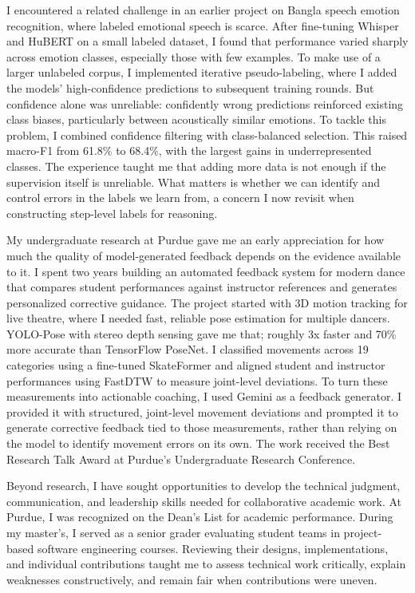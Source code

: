 \documentclass{article}
\begin{document}

I encountered a related challenge in an earlier project on Bangla speech emotion recognition, where labeled emotional speech is scarce. After fine-tuning Whisper and HuBERT on a small labeled dataset, I found that performance varied sharply across emotion classes, especially those with few examples. To make use of a larger unlabeled corpus, I implemented iterative pseudo-labeling, where I added the models’ high-confidence predictions to subsequent training rounds. But confidence alone was unreliable: confidently wrong predictions reinforced existing class biases, particularly between acoustically similar emotions. To tackle this problem, I combined confidence filtering with class-balanced selection. This raised macro-F1 from 61.8\% to 68.4\%, with the largest gains in underrepresented classes. The experience taught me that adding more data is not enough if the supervision itself is unreliable. What matters is whether we can identify and control errors in the labels we learn from, a concern I now revisit when constructing step-level labels for reasoning.


My undergraduate research at Purdue gave me an early appreciation for how much the quality of model-generated feedback depends on the evidence available to it. I spent two years building an automated feedback system for modern dance that compares student performances against instructor references and generates personalized corrective guidance. The project started with 3D motion tracking for live theatre, where I needed fast, reliable pose estimation for multiple dancers. YOLO-Pose with stereo depth sensing gave me that; roughly 3x faster and 70\% more accurate than TensorFlow PoseNet. I classified movements across 19 categories using a fine-tuned SkateFormer and aligned student and instructor performances using FastDTW to measure joint-level deviations. To turn these measurements into actionable coaching, I used Gemini as a feedback generator. I provided it with structured, joint-level movement deviations and prompted it to generate corrective feedback tied to those measurements, rather than relying on the model to identify movement errors on its own. The work received the Best Research Talk Award at Purdue’s Undergraduate Research Conference.

Beyond research, I have sought opportunities to develop the technical judgment, communication, and leadership skills needed for collaborative academic work. At Purdue, I was recognized on the Dean's List for academic performance. During my master's, I served as a senior grader evaluating student teams in project-based software engineering courses. Reviewing their designs, implementations, and individual contributions taught me to assess technical work critically, explain weaknesses constructively, and remain fair when contributions were uneven.
\end{document}
